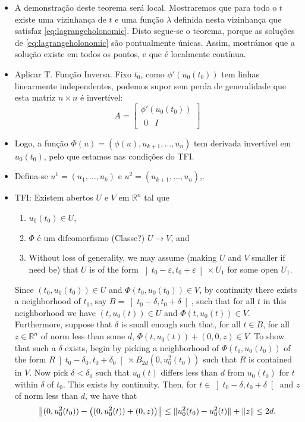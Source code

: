 \documentclass{article}
\theoremstyle{plain}
\theoremstyle{plain}
\theoremstyle{nonumberplain}
\theoremstyle{empty}
\newcommand{\R}{\mathbb{R}}
\DeclarePairedDelimiter\norm{\lVert}{\rVert}
\begin{document}
\begin{itemize}
\item A demonstração deste teorema será local. Mostraremos que para todo o $t$ existe uma vizinhança de $t$ e uma função $\lambda$ definida nesta vizinhança que satisfaz \eqref{eq:lagrangeholonomic}. Disto segue-se o teorema, porque as soluções de \eqref{eq:lagrangeholonomic} são pontualmente únicas. Assim, mostrámos que a solução existe em todos os pontos, e que é localmente contínua.

\item Aplicar T. Função Inversa. Fixo $t_0$, como $\phi'(u_0(t_0))$ tem linhas linearmente independentes, podemos supor sem perda de generalidade que esta matriz $n \times n$ é invertível:
\[
A = \begin{bmatrix}
\phi'(u_0(t_0))\\
\begin{matrix}
0 & I
\end{matrix}
\end{bmatrix}
\]

\item Logo, a função $\Phi(u) = (\phi(u), u_{k+1}, \dots, u_n)$ tem derivada invertível em $u_0(t_0)$, pelo que estamos nas condições do TFI.

\item Defina-se $u^1 = (u_1, \dots, u_k)$ e $u^2 = (u_{k+1}, \dots, u_n)$,.

\item TFI: Existem abertos $U$ e $V$ em $\R^n$ tal que
\begin{enumerate}
\item $u_0(t_0) \in U$,
\item $\Phi$ é um difeomorfismo (Classe?) $U \to V$, and
\item Without loss of generality, we may assume (making $U$ and $V$ smaller if need be) that $U$ is of the form $\left]t_0-\varepsilon, t_0+\varepsilon\right[ \times U_1$ for some open $U_1$.
\end{enumerate}

Since $(t_0, u_0(t_0)) \in U$ and $\Phi(t_0, u_0(t_0)) \in V$, by continuity there exists a neighborhood of $t_0$, say $B = \left]t_0 - \delta, t_0 + \delta\right[$, such that for all $t$ in this neighborhood we have $(t,u_0(t)) \in U$ and $\Phi(t,u_0(t)) \in V$. Furthermore, suppose that $\delta$ is small enough such that, for all $t \in B$, for all $z \in \R^{n}$ of norm less than some $d$, $\Phi(t,u_0(t)) + (0,0,z) \in V$. To show that such a $\delta$ exists, begin by picking a neighborhood of $\Phi(t_0, u_0(t_0))$ of the form $R \left]t_0-\delta_0, t_0 + \delta_0\right[ \times B_{2d}(0, u_0^2(t_0))$ such that $R$ is contained in $V$. Now pick $\delta < \delta_0$ such that $u_0(t)$ differs less than $d$ from $u_0(t_0)$ for $t$ within $\delta$ of $t_0$. This exists by continuity. Then, for $t \in \left]t_0-\delta, t_0 + \delta\right[$ and $z$ of norm less than $d$, we have that
\[\norm*{(0, u_0^2(t_0)) - \left((0, u_0^2(t)) + (0, z)\right)} \leq \norm{u_0^2(t_0) - u_0^2(t)} + \norm z \leq 2d.\]


\end{itemize}
\end{document}
